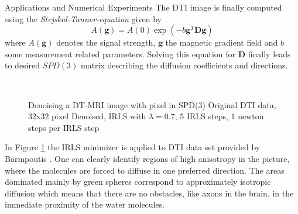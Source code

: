 \begin{chapter}{Applications and Numerical Experiments}
The DTI image is finally computed using the \emph{Stejskal-Tanner-equation} given by
\begin{equation}
    A(\mathbf{g})=A(0)\exp(-b\mathbf{g}^T\mathbf{D}\mathbf{g})
\end{equation}
where $A(\mathbf{g})$ denotes the signal strength, $\mathbf{g}$ the magnetic gradient field and $b$ some measurement related parameters. Solving this equation for $\mathbf{D}$ finally
leads to desired $SPD(3)$ matrix describing the diffusion coefficients and directions.\\
\begin{figure}[h!]
    \centering
    \\
    \caption[Denoising DT-MRI data]{Denoising a DT-MRI image with pixel in SPD(3)
	 Original DTI data, 32x32 pixel
	 Denoised, IRLS with $\lambda=0.7$, $5$ IRLS steps, $1$ newton steps per IRLS step
	\label{fig:application_dti1}
    }
\end{figure}

In Figure \ref{fig:application_dti1} the IRLS minimizer is applied to DTI data set provided by Barmpoutis \cite{barmpoutis}.
One can clearly identify regions of high anisotropy in the picture, where the molecules are forced to diffuse in one preferred direction.
The areas dominated mainly by green spheres correspond to approximately isotropic diffusion which means that there are no obstacles, like axons in the brain, in the 
immediate proximity of the water molecules.\\



\end{chapter}
